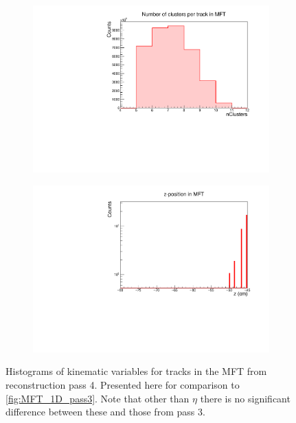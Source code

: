 \begin{figure}[h]
\begin{subfigure}[t]{.49\linewidth}
        \includegraphics[width=\linewidth]{Plots/pass4_MFT/nClusters_pass4.pdf}
        \caption{}
        \label{}
    \end{subfigure}
    \hfill
    \begin{subfigure}[t]{.49\linewidth}
        \centering
        \includegraphics[width=\linewidth]{Plots/pass4_MFT/Z_MFT_pass4.pdf}
        \caption{}
        \label{}
    \end{subfigure}
\caption[Histograms of $\eta$, $\varphi$, , and $z$ for tracks from pass 4 in the MFT]{Histograms of kinematic variables for tracks in the MFT from reconstruction pass 4. Presented here for comparison to \cref{fig:MFT_1D_pass3}. Note that other than $\eta$ there is no significant difference between these and those from pass 3. }
\label{fig:MFT_1D_pass4}
\end{figure}

